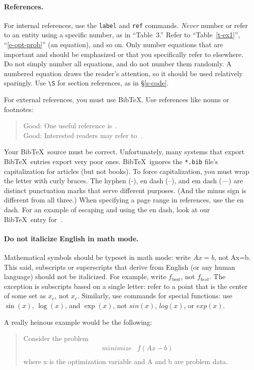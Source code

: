 \documentclass{article}
\begin{document}
\paragraph{References.}
For internal references, use the \texttt{label} and \texttt{ref} commands.
\emph{Never} number or refer to an entity using a specific number, as in ``Table~3.''
Refer to ``Table~\ref{t-ex1}'', ``\eqref{e-opt-prob}'' (an equation), and so on.
Only number equations that are important and should be emphasized or that you specifically refer to elsewhere. 
Do not simply number all equations, and do not number them randomly. 
A numbered equation draws the reader's attention, so it should be used relatively sparingly. 
Use \verb+\S+ for section references, as in \S\ref{s-code}.

For external references, you must use Bib\TeX. 
Use references like nouns or footnotes:
\begin{quote}
    Good: One useful reference is~\cite{BoV:04}. \\
    Good: Interested readers may refer to~\cite{BoV:04}.
\end{quote}

Your Bib\TeX\ source must be correct. 
Unfortunately, many systems that export Bib\TeX\ entries export very poor ones. 
Bib\TeX\ ignores the \texttt{*.bib} file's capitalization for articles (but not books). 
To force capitalization, you must wrap the letter with curly braces. 
The hyphen (-), en dash (--), and em dash (---) are distinct punctuation marks that serve different purposes.
(And the minus sign is different from all three.) 
When specifying a page range in references, use the en dash. 
For an example of escaping and using the en dash, look at our Bib\TeX\ entry for~\cite{Tref:2008}.

\paragraph{Do not italicize English in math mode.}
Mathematical symbols should be typeset in math mode: write $Ax=b$, not Ax=b. 
This said, subscripts or superscripts that derive from English (or any human language) should not be italicized. 
For example, write $f_\mathrm{best}$, not $f_{best}$. 
The exception is subscripts based on a single letter: refer to a point that is the center of some set as $x_c$, not $x_{\mathrm{c}}$.
Similarly, use commands for special functions: use $\sin(x)$, $\log(x)$, and $\exp(x)$, not $sin(x)$, $log(x)$, or $exp(x)$.

A really heinous example would be the following:
\begin{quote}
    Consider the problem
    \[
        \begin{array}{ll}
            minimize & f(Ax - b) \\
        \end{array}
    \]
    where x is the optimization variable and A and b are problem data.
\end{quote}
\end{document}
